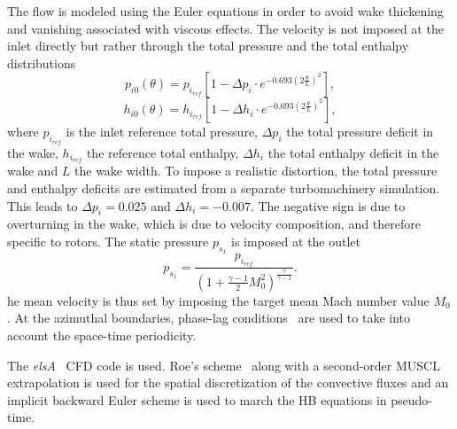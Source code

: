 The flow is modeled using the 
Euler equations in order to avoid wake thickening and vanishing
associated with viscous effects. 
The velocity is not imposed at the inlet directly
but rather through the total pressure and 
the total enthalpy distributions
\begin{equation}
  \label{eq:rotatingblocks_ptot}
    p_{i0} (\theta) = p_{i_{ref}} \left[1 - 
        \Delta p_i \cdot e^{
          -0.693 \left( 2 \frac{\theta}{L} \right) ^ 2}\right],
\end{equation}
\begin{equation}
  \label{eq:rotatingblocks_htot}
    h_{i0} (\theta) = h_{i_{ref}} \left[1- 
        \Delta h_i \cdot e^{
          -0.693 \left( 2 \frac{\theta}{L} \right) ^ 2}\right],
\end{equation}
where $p_{i_{ref}}$ is the inlet reference total pressure, $\Delta p_i$ the total pressure
deficit in the wake,
$h_{i_{ref}}$ the reference total enthalpy, $\Delta h_i$ the total enthalpy
deficit in the wake and $L$ the wake width.
To impose a realistic distortion, the total pressure and
enthalpy deficits are estimated from a separate turbomachinery simulation.
This leads to $\Delta p_i = 0.025$ and 
$\Delta h_i = - 0.007$.
The negative sign is due to overturning in the wake, which
is due to velocity composition, and therefore specific to rotors.
The static pressure $p_{s_1}$ is imposed at the outlet
\begin{equation}
    p_{s_1} = \frac{p_{i_{ref}}}{\left(1 + 
    \frac{\gamma - 1}{2} M_{0}^2 \right) ^ {\frac{\gamma}{ \gamma - 1}}}.
\end{equation}
he mean velocity is thus set by imposing the
target mean Mach number value $M_{0}$.
At the azimuthal boundaries, phase-lag conditions~\cite{Erdos1977} 
are used to take into account the space-time periodicity.

The \textit{elsA}~\cite{Cambier2013} CFD code is used.
Roe's scheme~\cite{Roe1981} along with a second-order MUSCL extrapolation 
is used for the spatial discretization of
the convective fluxes and an implicit backward Euler scheme is used
to march the HB equations in pseudo-time.

